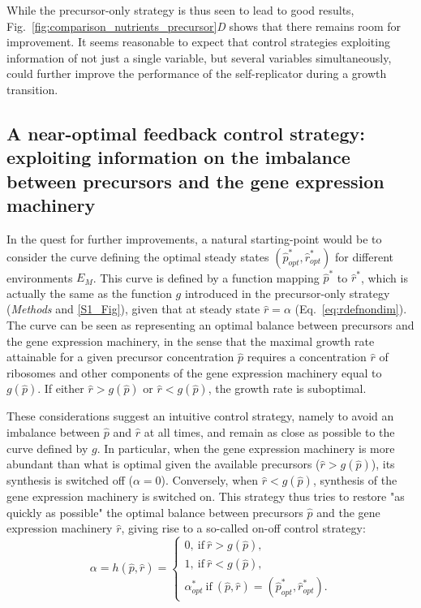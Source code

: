 While the precursor-only strategy is thus seen to lead to good results, Fig.~\ref{fig:comparison_nutrients_precursor}\textit{D} shows that there remains room for improvement.
It seems reasonable to expect that control strategies exploiting information of not just a single variable, but several variables simultaneously, could further improve the performance of the self-replicator during a growth transition.


\subsection{A near-optimal feedback control strategy: exploiting information on the imbalance between precursors and the gene expression machinery}
\label{sec:strategies}

In the quest for further improvements, a natural starting-point would be to consider the curve defining the optimal steady states $(\hat{p}^*_{opt},\hat{r}^*_{opt})$  for different environments $E_M$.
This curve is defined by a function mapping $\hat{p}^*$ to $\hat{r}^*$, which is actually the same as the function $g$ introduced in the precursor-only strategy (\textit{Methods} and \ref{S1_Fig}), given that at steady state $\hat{r}=\alpha$ (Eq.~\ref{eq:rdefnondim}).
The curve can be seen as representing an optimal balance between precursors and the gene expression machinery, in the sense that the maximal growth rate attainable for a given precursor concentration $\hat{p}$ requires a concentration $\hat{r}$ of ribosomes and other components of the gene expression machinery equal to $g(\hat{p})$. 
If either $\hat{r}>g(\hat{p})$ or $\hat{r}<g(\hat{p})$, the growth rate is suboptimal.

These considerations suggest an intuitive control strategy, namely to avoid an imbalance between $\hat{p}$ and $\hat{r}$ at all times, and remain as close as possible to the curve defined by $g$.
In particular, when the gene expression machinery is more abundant than what is optimal given the available precursors ($\hat{r} > g(\hat{p})$), its synthesis is switched off ($\alpha = 0$).
Conversely, when $\hat{r} < g(\hat{p})$, synthesis of the gene expression machinery is switched on.
This strategy thus tries to restore "as quickly as possible" the optimal balance between precursors $\hat{p}$ and the gene expression machinery $\hat{r}$, giving rise to a so-called on-off control strategy:
\begin{equation}
\label{eq:stratswitch}
\alpha = h(\hat{p},\hat{r}) =
\begin{cases}
0, \ \textrm{if} \ \hat{r} > g(\hat{p}),\\
1, \ \textrm{if} \ \hat{r} < g(\hat{p}), \\
\alpha_{opt}^* \ \textrm{if} \ (\hat{p},\hat{r})=(\hat{p}_{opt}^*,\hat{r}_{opt}^*).
\end{cases}
\end{equation}

